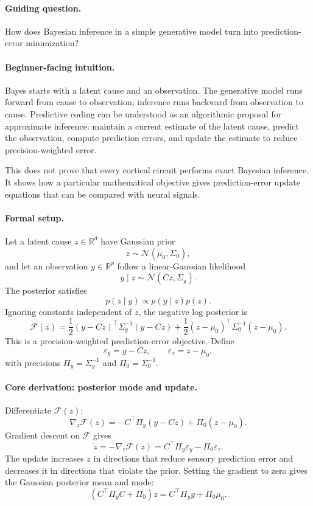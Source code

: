 \paragraph{Guiding question.}
How does Bayesian inference in a simple generative model turn into prediction-error minimization?

\paragraph{Beginner-facing intuition.}
Bayes starts with a latent cause and an observation. The generative model runs forward from cause to observation; inference runs backward from observation to cause. Predictive coding can be understood as an algorithmic proposal for approximate inference: maintain a current estimate of the latent cause, predict the observation, compute prediction errors, and update the estimate to reduce precision-weighted error.

This does not prove that every cortical circuit performs exact Bayesian inference. It shows how a particular mathematical objective gives prediction-error update equations that can be compared with neural signals.

\paragraph{Formal setup.}
Let a latent cause \(z\in\mathbb R^d\) have Gaussian prior
\[
z\sim\mathcal N(\mu_0,\Sigma_0),
\]
and let an observation \(y\in\mathbb R^p\) follow a linear-Gaussian likelihood
\[
y\mid z\sim\mathcal N(Cz,\Sigma_y).
\]
The posterior satisfies
\[
p(z\mid y)\propto p(y\mid z)p(z).
\]
Ignoring constants independent of \(z\), the negative log posterior is
\[
\mathcal F(z)
=\frac12(y-Cz)^\top\Sigma_y^{-1}(y-Cz)
+\frac12(z-\mu_0)^\top\Sigma_0^{-1}(z-\mu_0).
\]
This is a precision-weighted prediction-error objective. Define
\[
\varepsilon_y=y-Cz,\qquad \varepsilon_z=z-\mu_0,
\]
with precisions \(\Pi_y=\Sigma_y^{-1}\) and \(\Pi_0=\Sigma_0^{-1}\).

\paragraph{Core derivation: posterior mode and update.}
Differentiate \(\mathcal F(z)\):
\[
\nabla_z\mathcal F(z)
=-C^\top\Pi_y(y-Cz)+\Pi_0(z-\mu_0).
\]
Gradient descent on \(\mathcal F\) gives
\[
\dot z
=-\nabla_z\mathcal F(z)
=C^\top\Pi_y\varepsilon_y-\Pi_0\varepsilon_z.
\]
The update increases \(z\) in directions that reduce sensory prediction error and decreases it in directions that violate the prior. Setting the gradient to zero gives the Gaussian posterior mean and mode:
\[
(C^\top\Pi_y C+\Pi_0)z
=C^\top\Pi_y y+\Pi_0\mu_0.
\]

